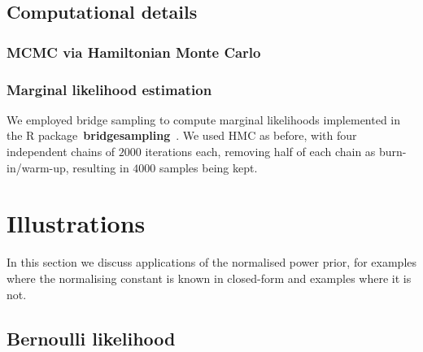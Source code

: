\documentclass[a4paper, notitlepage, 11pt]{article}
\begin{document}
%  

\subsection{Computational details}
\label{sec:computing}

\subsubsection{MCMC via Hamiltonian Monte Carlo}

\subsubsection{Marginal likelihood estimation}

We employed  bridge sampling to compute marginal likelihoods implemented in the R package~\textbf{bridgesampling}~\citep{Gronau2017}.
We used HMC as before, with four independent chains of $2000$ iterations each, removing half of each chain as burn-in/warm-up, resulting in $4000$ samples being kept.

\section{Illustrations}
\label{sec:illustrations}

In this section we discuss applications of the normalised power prior, for examples where the normalising constant is known in closed-form and examples where it is not.  

\subsection{Bernoulli likelihood}
\label{sec:reproduce_N2009}
\end{document}
